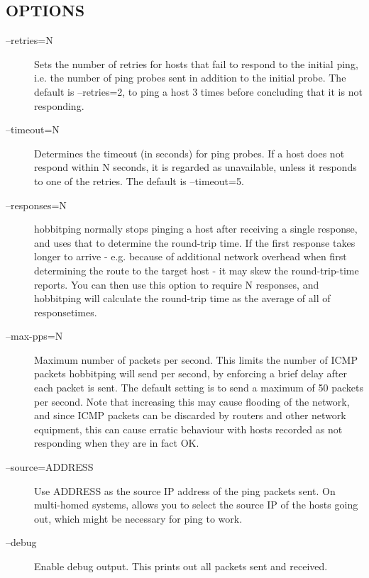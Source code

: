  
\subsection{OPTIONS}
\begin{description}
\item[--retries=N] Sets the number of retries for hosts that fail to
  respond to the initial ping, i.e. the number of ping probes sent in
  addition to the initial probe. The default is --retries=2, to ping a
  host 3 times before concluding that it is not responding. 


 

\item[--timeout=N] Determines the timeout (in seconds) for ping
  probes. If a host does not respond within N seconds, it is regarded
  as unavailable, unless it responds to one of the retries. The
  default is --timeout=5. 


 

\item[--responses=N] hobbitping normally stops pinging a host after
  receiving a single response, and uses that to determine the
  round-trip time. If the first response takes longer to arrive -
  e.g. because of additional network overhead when first determining
  the route to the target host - it may skew the round-trip-time
  reports. You can then use this option to require N responses, and
  hobbitping will calculate the round-trip time as the average of all
  of responsetimes. 


 

\item[--max-pps=N] Maximum number of packets per second. This limits
  the number of ICMP packets hobbitping will send per second, by
  enforcing a brief delay after each packet is sent. The default
  setting is to send a maximum of 50 packets per second. Note that
  increasing this may cause flooding of the network, and since ICMP
  packets can be discarded by routers and other network equipment,
  this can cause erratic behaviour with hosts recorded as not
  responding when they are in fact OK. 


 

\item[--source=ADDRESS] Use ADDRESS as the source IP address of the
  ping packets sent. On multi-homed systems, allows you to select the
  source IP of the hosts going out, which might be necessary for ping
  to work. 


 

\item[--debug] Enable debug output. This prints out all packets sent and received. 



\end{description}
